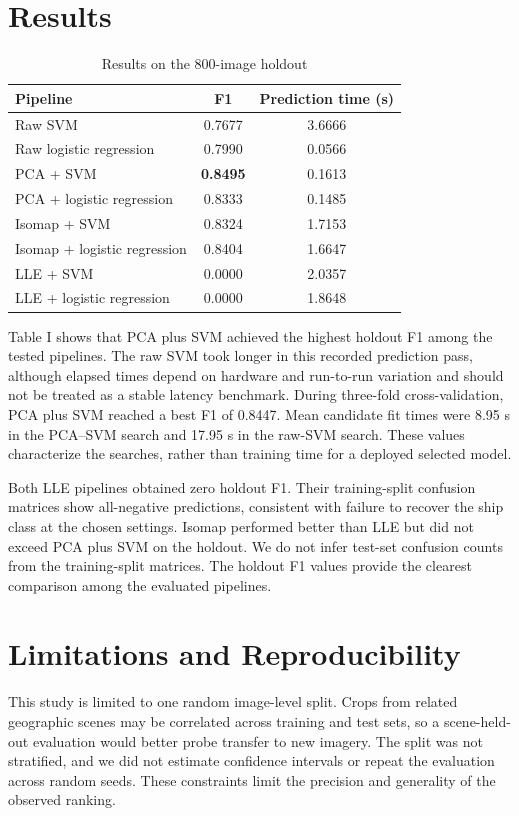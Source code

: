 \documentclass[conference]{IEEEtran}
\begin{document}
\section{Results}
\begin{table}[ht]
\caption{Results on the 800-image holdout}
\centering
\begin{tabular}{lcc}
\hline
Pipeline & F1 & Prediction time (s) \\
\hline
Raw SVM & 0.7677 & 3.6666 \\
Raw logistic regression & 0.7990 & 0.0566 \\
PCA + SVM & \textbf{0.8495} & 0.1613 \\
PCA + logistic regression & 0.8333 & 0.1485 \\
Isomap + SVM & 0.8324 & 1.7153 \\
Isomap + logistic regression & 0.8404 & 1.6647 \\
LLE + SVM & 0.0000 & 2.0357 \\
LLE + logistic regression & 0.0000 & 1.8648 \\
\hline
\end{tabular}
\end{table}
Table I shows that PCA plus SVM achieved the highest holdout F1 among the tested pipelines. The raw SVM took longer in this recorded prediction pass, although elapsed times depend on hardware and run-to-run variation and should not be treated as a stable latency benchmark. During three-fold cross-validation, PCA plus SVM reached a best F1 of 0.8447. Mean candidate fit times were 8.95 s in the PCA--SVM search and 17.95 s in the raw-SVM search. These values characterize the searches, rather than training time for a deployed selected model.

Both LLE pipelines obtained zero holdout F1. Their training-split confusion matrices show all-negative predictions, consistent with failure to recover the ship class at the chosen settings. Isomap performed better than LLE but did not exceed PCA plus SVM on the holdout. We do not infer test-set confusion counts from the training-split matrices. The holdout F1 values provide the clearest comparison among the evaluated pipelines.

\balance
\section{Limitations and Reproducibility}
This study is limited to one random image-level split. Crops from related geographic scenes may be correlated across training and test sets, so a scene-held-out evaluation would better probe transfer to new imagery. The split was not stratified, and we did not estimate confidence intervals or repeat the evaluation across random seeds. These constraints limit the precision and generality of the observed ranking.
\end{document}
